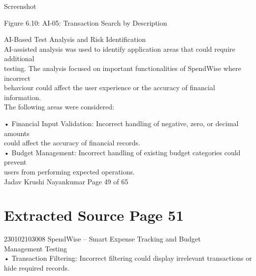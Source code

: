 \documentclass[12pt,a4paper]{report}
\begin{document}
\smallskip

\smallskip
Screenshot\\ 

\smallskip

\smallskip

\smallskip

\smallskip
Figure 6.10: AI-05: Transaction Search by Description\\ 

\smallskip

\smallskip

 AI-Based Test Analysis and Risk Identification\\ 

\smallskip
AI-assisted analysis was used to identify application areas that could require additional\\ 
testing. The analysis focused on important functionalities of SpendWise where incorrect\\ 
behaviour could affect the user experience or the accuracy of financial information.\\ 
The following areas were considered:\\ 

\smallskip

\smallskip
• Financial Input Validation: Incorrect handling of negative, zero, or decimal amounts\\ 
could affect the accuracy of financial records.\\ 

\smallskip
• Budget Management: Incorrect handling of existing budget categories could prevent\\ 
users from performing expected operations.\\ 

\smallskip
Jadav Krushi Nayankumar                                                        Page 49 of 65\\ 

\clearpage
\section*{Extracted Source Page 51}
230102103008                         SpendWise – Smart Expense Tracking and Budget\\ 
Management Testing\\ 

\smallskip
• Transaction Filtering: Incorrect filtering could display irrelevant transactions or\\ 
hide required records.\\ 
\end{document}

